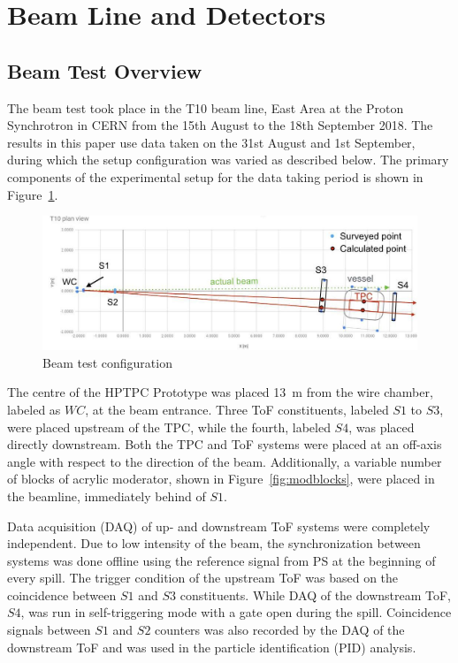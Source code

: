 \section{Beam Line and Detectors}
\label{hptpcPaper:sec:Methods}

    \subsection{Beam Test Overview}
    The beam test took place in the T10 beam line, East Area at the Proton Synchrotron in CERN from the 15th August to the 18th September 2018.
    The results in this paper use data taken on the 31st August and 1st September, during which the setup configuration was varied as described below.
    The primary components of the  experimental setup for the data taking period is shown in Figure~\ref{fig:setup}.
    \begin{figure}
    \includegraphics[width=1.0\linewidth]{files/Figures/T10Diagram.jpg}
    	\caption{Beam test configuration}
    		\label{fig:setup}
    \end{figure}
    The centre of the HPTPC Prototype was placed 13~m from the wire chamber, labeled as $WC$, at the beam entrance. Three ToF constituents, labeled $S1$ to $S3$, were placed upstream of the TPC, while the fourth, labeled $S4$, was placed directly downstream. Both the TPC and ToF systems were placed at an off-axis angle with respect to the direction of the beam.
    Additionally, a variable number of blocks of acrylic moderator, shown in Figure~\ref{fig:modblocks}, were placed in the beamline, immediately behind of $S1$.
    
    
    Data acquisition (DAQ) of up- and downstream ToF systems were completely independent. Due to low intensity of the beam, the synchronization between systems was done offline using the reference signal from PS at the beginning of every spill. The trigger condition of the upstream ToF was based on the coincidence between $S1$ and $S3$ constituents. While DAQ of the downstream ToF, $S4$, was run in self-triggering mode with a gate open during the spill. Coincidence signals between $S1$ and $S2$ counters was also recorded by the DAQ of the downstream ToF and was used in the particle identification (PID) analysis. 
    
